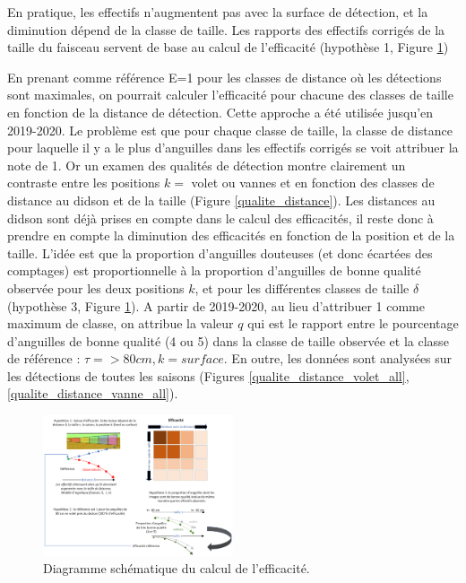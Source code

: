 \documentclass[11pt,twocolumn,titlepage,twoside]{article}
\begin{document}
En pratique, les effectifs n'augmentent pas avec la surface de détection, et la
diminution dépend de la classe de taille. Les rapports des effectifs corrigés de
la taille du faisceau servent de base au calcul de l'efficacité (hypothèse 1, 
Figure \ref{fig_diag_efficacite})

En prenant comme référence E=1 pour
les classes de distance où les détections sont maximales, on pourrait calculer
l'efficacité pour chacune des classes de taille en fonction de la distance de
détection. Cette approche a été utilisée jusqu'en 2019-2020.
Le problème est que pour chaque classe de taille, la classe de
distance pour laquelle il y a le plus d'anguilles dans les effectifs corrigés se
voit attribuer la note de 1. Or un examen des qualités de détection montre clairement
un contraste entre les positions $k=$ volet ou vannes et en fonction
des classes de distance au didson et de la taille (Figure
\ref{qualite_distance}).
Les distances au didson sont déjà prises en compte dans le calcul des
efficacités, il reste donc à prendre en compte la diminution des efficacités en
fonction de la position et de la taille. L'idée est que la proportion
d'anguilles douteuses (et donc écartées des comptages) est proportionnelle
à la proportion d'anguilles de bonne qualité observée pour
les deux positions $k$, et pour les différentes classes de taille $\delta$ (hypothèse 3, 
Figure \ref{fig_diag_efficacite}).
A partir de 2019-2020, au lieu d'attribuer 1 comme maximum de classe, on
attribue la valeur $q$ qui est le rapport entre le pourcentage d'anguilles de bonne
qualité (4 ou 5) dans la classe de taille observée et la classe de référence :
$\tau=>80cm, k =surface$. En outre, les données sont analysées sur les détections de toutes les saisons (Figures
\ref{qualite_distance_volet_all}, \ref{qualite_distance_vanne_all}).

\begin{figure}[htbp]
       \includegraphics[width=0.5\textwidth]{visio_efficacite_didson.png}
        \caption[Diagramme efficacité.]{Diagramme schématique du calcul de
        l'efficacité.}
       \label{fig_diag_efficacite} 
\end{figure}
\end{document}
